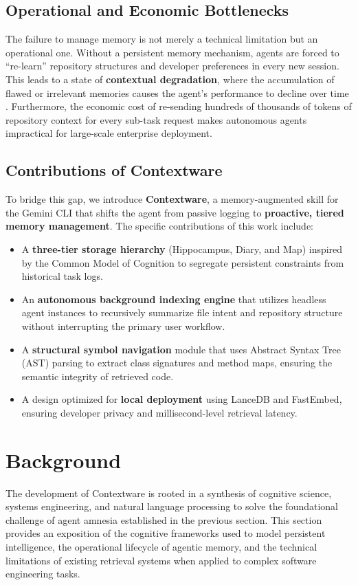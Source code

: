 \documentclass[conference]{IEEEtran}
\begin{document}
\subsection{Operational and Economic Bottlenecks}
The failure to manage memory is not merely a technical limitation but an operational one. Without a persistent memory mechanism, agents are forced to ``re-learn'' repository structures and developer preferences in every new session. This leads to a state of \textbf{contextual degradation}, where the accumulation of flawed or irrelevant memories causes the agent's performance to decline over time \cite{Xu2025Memory}. Furthermore, the economic cost of re-sending hundreds of thousands of tokens of repository context for every sub-task request makes autonomous agents impractical for large-scale enterprise deployment.

\subsection{Contributions of Contextware}
To bridge this gap, we introduce \textbf{Contextware}, a memory-augmented skill for the Gemini CLI that shifts the agent from passive logging to \textbf{proactive, tiered memory management}. The specific contributions of this work include:
\begin{itemize}
    \item A \textbf{three-tier storage hierarchy} (Hippocampus, Diary, and Map) inspired by the Common Model of Cognition to segregate persistent constraints from historical task logs.
    \item An \textbf{autonomous background indexing engine} that utilizes headless agent instances to recursively summarize file intent and repository structure without interrupting the primary user workflow.
    \item A \textbf{structural symbol navigation} module that uses Abstract Syntax Tree (AST) parsing to extract class signatures and method maps, ensuring the semantic integrity of retrieved code.
    \item A design optimized for \textbf{local deployment} using LanceDB and FastEmbed, ensuring developer privacy and millisecond-level retrieval latency.
\end{itemize}

\section{Background}

The development of Contextware is rooted in a synthesis of cognitive science, systems engineering, and natural language processing to solve the foundational challenge of agent amnesia established in the previous section. This section provides an exposition of the cognitive frameworks used to model persistent intelligence, the operational lifecycle of agentic memory, and the technical limitations of existing retrieval systems when applied to complex software engineering tasks.
\end{document}
